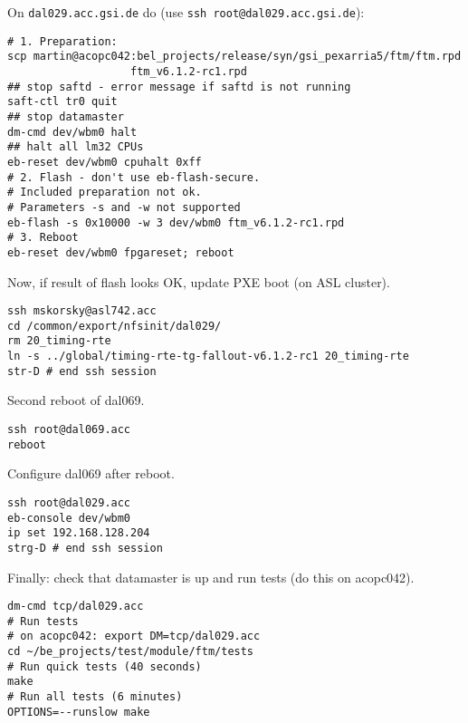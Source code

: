 \documentclass[12pt,a4paper]{report}
\begin{document}
On \texttt{dal029.acc.gsi.de} do (use \texttt{ssh root@dal029.acc.gsi.de}):
\begin{verbatim}
# 1. Preparation:
scp martin@acopc042:bel_projects/release/syn/gsi_pexarria5/ftm/ftm.rpd
                   ftm_v6.1.2-rc1.rpd
## stop saftd - error message if saftd is not running
saft-ctl tr0 quit
## stop datamaster
dm-cmd dev/wbm0 halt
## halt all lm32 CPUs
eb-reset dev/wbm0 cpuhalt 0xff
# 2. Flash - don't use eb-flash-secure.
# Included preparation not ok.
# Parameters -s and -w not supported
eb-flash -s 0x10000 -w 3 dev/wbm0 ftm_v6.1.2-rc1.rpd
# 3. Reboot
eb-reset dev/wbm0 fpgareset; reboot
\end{verbatim}
Now, if result of flash looks OK, update PXE boot (on ASL cluster).
\begin{verbatim}
ssh mskorsky@asl742.acc
cd /common/export/nfsinit/dal029/
rm 20_timing-rte
ln -s ../global/timing-rte-tg-fallout-v6.1.2-rc1 20_timing-rte
str-D # end ssh session
\end{verbatim}
Second reboot of dal069.
\begin{verbatim}
ssh root@dal069.acc
reboot
\end{verbatim}
Configure dal069 after reboot.
\begin{verbatim}
ssh root@dal029.acc
eb-console dev/wbm0
ip set 192.168.128.204
strg-D # end ssh session
\end{verbatim}
Finally: check that datamaster is up and run tests (do this on acopc042).
\begin{verbatim}
dm-cmd tcp/dal029.acc
# Run tests
# on acopc042: export DM=tcp/dal029.acc
cd ~/be_projects/test/module/ftm/tests
# Run quick tests (40 seconds)
make
# Run all tests (6 minutes)
OPTIONS=--runslow make
\end{verbatim}
\end{document}
